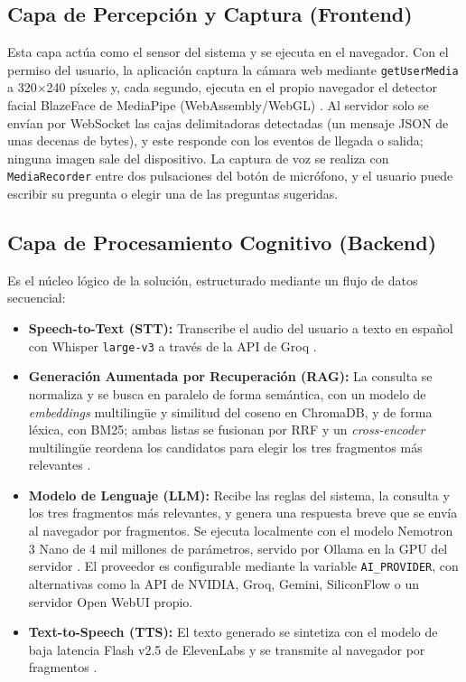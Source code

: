 \subsection{Capa de Percepción y Captura (Frontend)}
Esta capa actúa como el sensor del sistema y se ejecuta en el navegador. Con el permiso del usuario, la aplicación captura la cámara web mediante \texttt{getUserMedia} a 320$\times$240 píxeles y, cada segundo, ejecuta en el propio navegador el detector facial BlazeFace de MediaPipe (WebAssembly/WebGL) \cite{bazarevsky2019blazeface,lugaresi2019mediapipe}. Al servidor solo se envían por WebSocket las cajas delimitadoras detectadas (un mensaje JSON de unas decenas de bytes), y este responde con los eventos de llegada o salida; ninguna imagen sale del dispositivo. La captura de voz se realiza con \texttt{MediaRecorder} entre dos pulsaciones del botón de micrófono, y el usuario puede escribir su pregunta o elegir una de las preguntas sugeridas.

\subsection{Capa de Procesamiento Cognitivo (Backend)}
Es el núcleo lógico de la solución, estructurado mediante un flujo de datos secuencial:
\begin{itemize}
    \item \textbf{Speech-to-Text (STT):} Transcribe el audio del usuario a texto en español con Whisper \texttt{large-v3} a través de la API de Groq \cite{radford2023whisper}.
    \item \textbf{Generación Aumentada por Recuperación (RAG):} La consulta se normaliza y se busca en paralelo de forma semántica, con un modelo de \textit{embeddings} multilingüe y similitud del coseno en ChromaDB, y de forma léxica, con BM25; ambas listas se fusionan por RRF y un \textit{cross-encoder} multilingüe reordena los candidatos para elegir los tres fragmentos más relevantes \cite{lewis2020rag,chroma2024,robertson2009bm25,cormack2009rrf}.
    \item \textbf{Modelo de Lenguaje (LLM):} Recibe las reglas del sistema, la consulta y los tres fragmentos más relevantes, y genera una respuesta breve que se envía al navegador por fragmentos. Se ejecuta localmente con el modelo Nemotron 3 Nano de 4 mil millones de parámetros, servido por Ollama en la GPU del servidor \cite{nemotron2025,ollama2025}. El proveedor es configurable mediante la variable \texttt{AI\_PROVIDER}, con alternativas como la API de NVIDIA, Groq, Gemini, SiliconFlow o un servidor Open WebUI propio.
    \item \textbf{Text-to-Speech (TTS):} El texto generado se sintetiza con el modelo de baja latencia Flash v2.5 de ElevenLabs y se transmite al navegador por fragmentos \cite{elevenlabs2025}.
\end{itemize}

